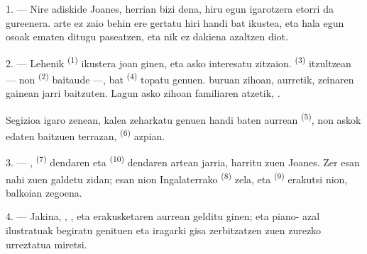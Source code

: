 %

\VUsaut{4.0mm}
\VUsaut{3.0mm}

\VUsaut{3.0mm}

1. --- Nire adiskide Joanes, herrian bizi dena, hiru egun igarotzera etorri da
gureenera.  arte ez zaio behin ere gertatu hiri handi bat ikustea,
eta hala egun osoak ematen ditugu paseatzen, eta nik ez dakiena azaltzen diot.

2. --- Lehenik  \textsuperscript{(1)} ikustera joan ginen, eta
asko interesatu zitzaion.  \textsuperscript{(3)} itzultzean --- non
 \textsuperscript{(2)} baitaude ---,  bat
\textsuperscript{(4)} topatu genuen.  buruan
 zihoan,  aurretik, zeinaren gainean
 jarri baitzuten. Lagun asko zihoan familiaren atzetik,
.

Segizioa igaro zenean, kalea zeharkatu genuen  handi baten
aurrean \textsuperscript{(5)}, non  askok 
edaten baitzuen terrazan,  \textsuperscript{(6)}
azpian.

3. --- , 
\textsuperscript{(7)} dendaren eta 
\textsuperscript{(10)} dendaren artean jarria, harritu zuen Joanes. Zer esan nahi
zuen galdetu zidan; esan nion Ingalaterrako 
\textsuperscript{(8)} zela, eta  \textsuperscript{(9)} erakutsi
nion, balkoian zegoena.

\VUsaut{3.0mm}

4. --- Jakina, , ,
 eta  erakusketaren aurrean gelditu ginen;
 eta piano- azal ilustratuak begiratu genituen
eta iragarki gisa zerbitzatzen zuen zurezko  urreztatua miretsi.

